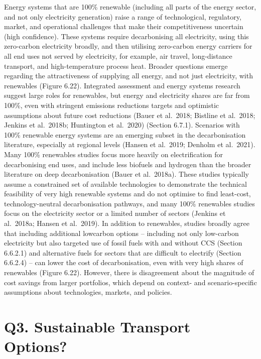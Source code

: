 \documentclass[
  letterpaper,
  DIV=11,
  numbers=noendperiod]{scrreprt}
\begin{document}
Energy systems that are 100\% renewable (including all parts of the
energy sector, and not only electricity generation) raise a range of
technological, regulatory, market, and operational challenges that make
their competitiveness uncertain (high confidence). These systems require
decarbonising all electricity, using this zero-carbon electricity
broadly, and then utilising zero-carbon energy carriers for all end uses
not served by electricity, for example, air travel, long-distance
transport, and high-temperature process heat. Broader questions emerge
regarding the attractiveness of supplying all energy, and not just
electricity, with renewables (Figure 6.22). Integrated assessment and
energy systems research suggest large roles for renewables, but energy
and electricity shares are far from 100\%, even with stringent emissions
reductions targets and optimistic assumptions about future cost
reductions (Bauer et al.~2018; Bistline et al.~2018; Jenkins et
al.~2018b; Huntington et al.~2020) (Section 6.7.1). Scenarios with 100\%
renewable energy systems are an emerging subset in the decarbonisation
literature, especially at regional levels (Hansen et al.~2019; Denholm
et al.~2021). Many 100\% renewables studies focus more heavily on
electrification for decarbonising end uses, and include less biofuels
and hydrogen than the broader literature on deep decarbonisation (Bauer
et al.~2018a). These studies typically assume a constrained set of
available technologies to demonstrate the technical feasibility of very
high renewable systems and do not optimise to find least-cost,
technology-neutral decarbonisation pathways, and many 100\% renewables
studies focus on the electricity sector or a limited number of sectors
(Jenkins et al.~2018a; Hansen et al.~2019). In addition to renewables,
studies broadly agree that including additional lowcarbon options --
including not only low-carbon electricity but also targeted use of
fossil fuels with and without CCS (Section 6.6.2.1) and alternative
fuels for sectors that are difficult to electrify (Section 6.6.2.4) --
can lower the cost of decarbonisation, even with very high shares of
renewables (Figure 6.22). However, there is disagreement about the
magnitude of cost savings from larger portfolios, which depend on
context- and scenario-specific assumptions about technologies, markets,
and policies.


\hypertarget{q3.-sustainable-transport-options}{%
\chapter{Q3. Sustainable Transport
Options?}\label{q3.-sustainable-transport-options}}
\end{document}
